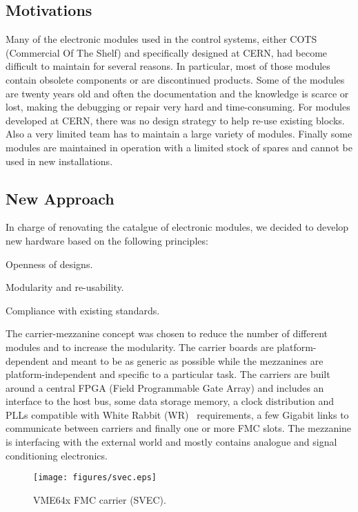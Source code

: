 \documentclass{JAC2003}
\begin{document}
\subsection{Motivations}
Many of the electronic modules used in the control systems, either COTS (Commercial Of The Shelf) and specifically designed at CERN, had become difficult to maintain for several reasons.
In particular, most of those modules contain obsolete components or are discontinued products.
Some of the modules are twenty years old and often the documentation and the knowledge is scarce or lost, making the debugging or repair very hard and time-consuming.
For modules developed at CERN, there was no design strategy to help re-use existing blocks.
Also a very limited team has to maintain a large variety of modules.
Finally some modules are maintained in operation with a limited stock of spares and cannot be used in new installations.

\subsection{New Approach}
In charge of renovating the catalgue of electronic modules, we decided to develop new hardware based on the following principles:
\begin{Itemize}
\item Openness of designs.
\item Modularity and re-usability.
\item Compliance with existing standards.
\end{Itemize}

The carrier-mezzanine concept was chosen to reduce the number of different modules and to increase the modularity.
The carrier boards are platform-dependent and meant to be as generic as possible while the mezzanines are platform-independent and specific to a particular task.
The carriers are built around a central FPGA (Field Programmable Gate Array) and includes an interface to the host bus, some data storage memory, a clock distribution and PLLs compatible with White Rabbit (WR)~\cite{wr} requirements, a few Gigabit links to communicate between carriers and finally one or more FMC slots.
The mezzanine is interfacing with the external world and mostly contains analogue and signal conditioning electronics.

\begin{figure}[htb]
   \centering
   \texttt{[image: figures/svec.eps]}
   \caption{VME64x FMC carrier (SVEC).}
   \label{svec}
\end{figure}
\end{document}

